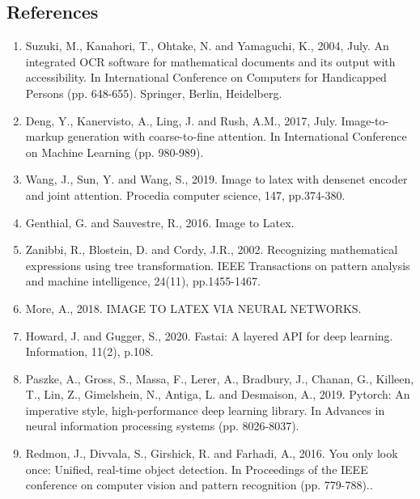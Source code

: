 \documentclass{sciposter}
\begin{document}
\begin{multicols}{3}
\section{References}

\begin{enumerate}

\item Suzuki, M., Kanahori, T., Ohtake, N. and Yamaguchi, K., 2004, July. An integrated OCR software for mathematical documents and its output with accessibility. In International Conference on Computers for Handicapped Persons (pp. 648-655). Springer, Berlin, Heidelberg.

\item Deng, Y., Kanervisto, A., Ling, J. and Rush, A.M., 2017, July. Image-to-markup generation with coarse-to-fine attention. In International Conference on Machine Learning (pp. 980-989).

\item Wang, J., Sun, Y. and Wang, S., 2019. Image to latex with densenet encoder and joint attention. Procedia computer science, 147, pp.374-380.

\item Genthial, G. and Sauvestre, R., 2016. Image to Latex.

\item Zanibbi, R., Blostein, D. and Cordy, J.R., 2002. Recognizing mathematical expressions using tree transformation. IEEE Transactions on pattern analysis and machine intelligence, 24(11), pp.1455-1467.

\item More, A., 2018. IMAGE TO LATEX VIA NEURAL NETWORKS.

\item Howard, J. and Gugger, S., 2020. Fastai: A layered API for deep learning. Information, 11(2), p.108.

\item Paszke, A., Gross, S., Massa, F., Lerer, A., Bradbury, J., Chanan, G., Killeen, T., Lin, Z., Gimelshein, N., Antiga, L. and Desmaison, A., 2019. Pytorch: An imperative style, high-performance deep learning library. In Advances in neural information processing systems (pp. 8026-8037).

\item Redmon, J., Divvala, S., Girshick, R. and Farhadi, A., 2016. You only look once: Unified, real-time object detection. In Proceedings of the IEEE conference on computer vision and pattern recognition (pp. 779-788)..


\end{enumerate}
\end{multicols}
\end{document}
